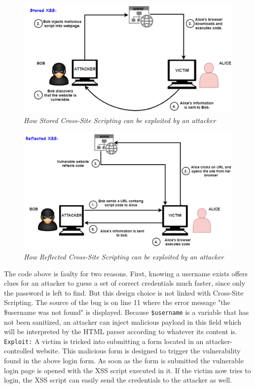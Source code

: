 \begin{figure}[ht]
 \centering
 \captionsetup{justification=centering}
 \includegraphics[width=\linewidth]{figures/storedxss.pdf}
 \caption[How Stored Cross-Site Scripting can be exploited by an attacker]{\textit{How Stored Cross-Site Scripting can be exploited by an attacker}}
 \label{fig:storedxss}
\end{figure}

\begin{figure}[ht]
 \centering
 \captionsetup{justification=centering}
 \includegraphics[width=\linewidth]{figures/reflectedxss.pdf}
 \caption[How Reflected Cross-Site Scripting can be exploited by an attacker]{\textit{How Reflected Cross-Site Scripting can be exploited by an attacker}}
 \label{fig:reflectedxss}
\end{figure}

The code above is faulty for two reasons. First, knowing a username exists offers clues for an attacker to guess a set of correct credentials much faster, since only the password is left to find. But this design choice is not linked with Cross-Site Scripting. The source of the bug is on line 11 where the error message "the \$username was not found" is displayed. Because {\tt \$username} is a variable that has not been sanitized, an attacker can inject malicious payload in this field which will be interpreted by the HTML parser according to whatever its content is. 
{\tt Exploit:} A victim is tricked into submitting a form located in an attacker-controlled website. This malicious form is designed to trigger the vulnerability found in the above login form. As soon as the form is submitted the vulnerable login page is opened with the XSS script executed in it. If the victim now tries to login, the XSS script can easily send the
credentials to the attacker as well. 

